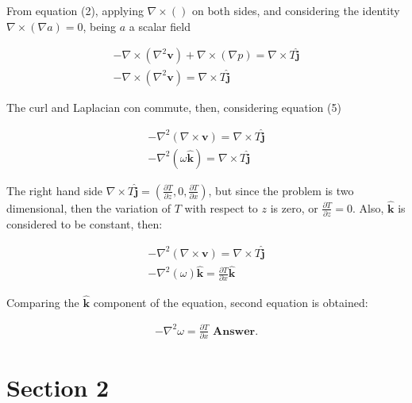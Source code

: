 \documentclass[12pt]{article}
\begin{document}
From equation (2), applying $\nabla \times ()$ on both sides, and considering the identity $\nabla \times (\nabla a) = 0$, being $a$ a scalar field

\begin{eqnarray}
    -\nabla \times(\nabla^2 \mathbf{v}) + \nabla \times(\nabla p) = \nabla\times T\mathbf{\hat{j}} \\
        -\nabla \times(\nabla^2 \mathbf{v}) = \nabla\times T\mathbf{\hat{j}} 
\end{eqnarray}

The curl and Laplacian con commute, then, considering equation (5)

\vspace{-5mm}

\begin{eqnarray}
        -\nabla^2( \nabla \times\mathbf{v}) = \nabla\times T\mathbf{\hat{j}} \\
        -\nabla^2( \omega \mathbf{\hat{k}}) = \nabla\times T\mathbf{\hat{j}} 
\end{eqnarray}

\vspace{-3mm}

The right hand side $\nabla\times T\mathbf{\hat{j}} = (\frac{\partial T}{\partial z}, 0 , \frac{\partial T}{\partial x})$, but since the problem is two dimensional, then the variation of $T$ with respect to $z$ is zero, or $\frac{\partial T}{\partial z} = 0$. Also, $\mathbf{\hat{k}}$ is considered to be constant, then:

\vspace{-5mm}
\begin{eqnarray}
        -\nabla^2( \nabla \times\mathbf{v}) = \nabla\times T\mathbf{\hat{j}} \\
        -\nabla^2( \omega )\mathbf{\hat{k}} = \frac{\partial T}{\partial x} \mathbf{\hat{k}} 
\end{eqnarray}

\vspace{-5mm}
Comparing the $\mathbf{\hat{k}}$ component of the equation, second equation is obtained:

\vspace{-5mm}
\begin{eqnarray}
        -\nabla^2 \omega = \frac{\partial T}{\partial x} \textbf{ Answer.}
\end{eqnarray}


\section{Section 2} 
\end{document}
